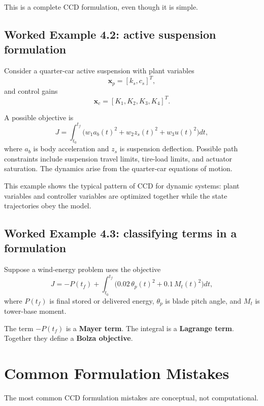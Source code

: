 \documentclass[11pt]{article}
\newcommand{\vect}[1]{\boldsymbol{#1}}
\newcommand{\xp}{\vect{x}_p}
\newcommand{\xc}{\vect{x}_c}
\begin{document}
This is a complete CCD formulation, even though it is simple.

\subsection{Worked Example 4.2: active suspension formulation}

Consider a quarter-car active suspension with plant variables
\begin{equation}
\xp = [k_s, c_s]^T,
\end{equation}
and control gains
\begin{equation}
\xc = [K_1, K_2, K_3, K_4]^T.
\end{equation}

A possible objective is
\begin{equation}
J = \int_{t_0}^{t_f} \Big(w_1 a_b(t)^2 + w_2 z_s(t)^2 + w_3 u(t)^2\Big)dt,
\end{equation}
where $a_b$ is body acceleration and $z_s$ is suspension deflection. Possible path constraints include suspension travel limits, tire-load limits, and actuator saturation. The dynamics arise from the quarter-car equations of motion.

This example shows the typical pattern of CCD for dynamic systems: plant variables and controller variables are optimized together while the state trajectories obey the model.

\subsection{Worked Example 4.3: classifying terms in a formulation}

Suppose a wind-energy problem uses the objective
\begin{equation}
J = -P(t_f) + \int_{t_0}^{t_f} \big(0.02\,\theta_p(t)^2 + 0.1\,M_t(t)^2\big)dt,
\end{equation}
where $P(t_f)$ is final stored or delivered energy, $\theta_p$ is blade pitch angle, and $M_t$ is tower-base moment.

The term $-P(t_f)$ is a \textbf{Mayer term}. The integral is a \textbf{Lagrange term}. Together they define a \textbf{Bolza objective}.

\section{Common Formulation Mistakes}

The most common CCD formulation mistakes are conceptual, not computational.
\end{document}
